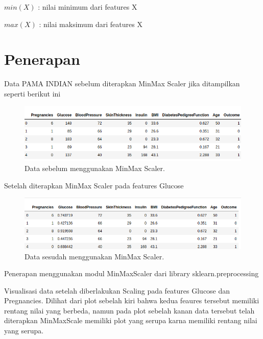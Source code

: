 \documentclass[conference]{IEEEtran}
\begin{document}
$min(X)$ : nilai minimum dari features X

$max(X)$ : nilai maksimum dari features X

\section{Penerapan}
Data PAMA INDIAN sebelum diterapkan MinMax Scaler jika ditampilkan seperti berikut ini

\begin{figure}[htbp]
	\includegraphics[width=\linewidth]{img/sebelumminmax.png}
	\caption{Data sebelum menggunakan MinMax Scaler.}
\end{figure}

Setelah diterapkan MinMax Scaler pada features Glucose

\begin{figure}[htbp]
	\includegraphics[width=\linewidth]{img/sesudahminmax.png}
	\caption{Data sesudah menggunakan MinMax Scaler.}
\end{figure}

Penerapan menggunakan modul MinMaxScaler dari library sklearn.preprocessing

Visualisasi data setelah diberlakukan Scaling pada features Glucose dan Pregnancies. Dilihat dari plot sebelah kiri bahwa kedua feaures tersebut memiliki rentang nilai yang berbeda, namun pada plot sebelah kanan data tersebut telah diterapkan MinMaxScale memiliki plot yang serupa karna memiliki rentang nilai yang serupa. 
\end{document}
